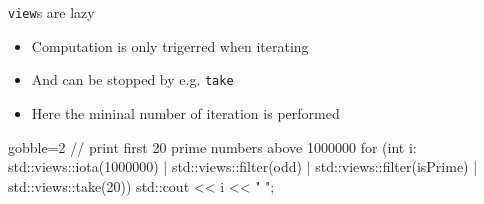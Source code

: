 \begin{frame}[fragile]
  \begin{exampleblock}{\texttt{view}s are lazy}
    \begin{itemize}
    \item Computation is only trigerred when iterating
    \item And can be stopped by e.g. \texttt{take}
    \item Here the mininal number of iteration is performed
    \end{itemize}
    { \scriptsize
      \begin{cppcode*}{gobble=2}
        // print first 20 prime numbers above 1000000
        for (int i: std::views::iota(1000000) | std::views::filter(odd)
                                              | std::views::filter(isPrime)
                                              | std::views::take(20)) {
          std::cout << i << " ";
        }
      \end{cppcode*}
    }
  \end{exampleblock}
\end{frame}
